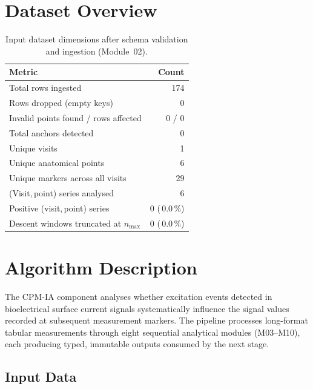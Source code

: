 \documentclass[a4paper,11pt]{article}
\begin{document}
\section{Dataset Overview}

\begin{table}[h!]
\centering
\small
\caption{Input dataset dimensions after schema validation and ingestion (Module~02).}
\begin{tabular}{lr}
\toprule
\textbf{Metric} & \textbf{Count} \\
\midrule
Total rows ingested                        & 174 \\
Rows dropped (empty keys)                  & 0 \\
Invalid points found / rows affected       & 0 / 0 \\
Total anchors detected                     & 0 \\
Unique visits                          & 1 \\
Unique anatomical points               & 6 \\
Unique markers across all visits       & 29 \\
(Visit,\,point) series analysed        & 6 \\
Positive (visit,\,point) series        & 0 (\,0.0\,\%) \\
Descent windows truncated at $n_{\max}$ & 0 (\,0.0\,\%) \\
\bottomrule
\end{tabular}
\end{table}

\section{Algorithm Description}

The CPM-IA component analyses whether excitation events detected in bioelectrical surface
current signals systematically influence the signal values recorded at subsequent measurement
markers. The pipeline processes long-format tabular measurements through eight sequential
analytical modules (M03--M10), each producing typed, immutable outputs consumed by the next
stage.

\subsection{Input Data}
\end{document}
